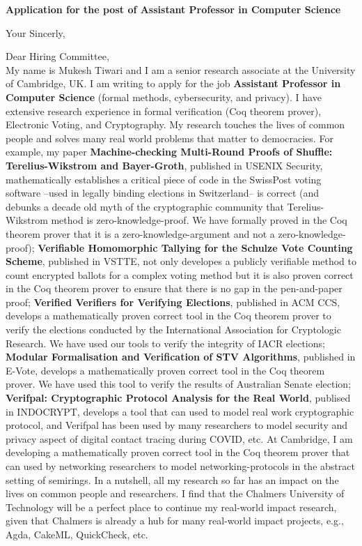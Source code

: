 \documentclass[11pt,a4paper,roman]{moderncv}
\begin{document}
\date{}
\opening{\textbf{Application for the post of Assistant Professor in Computer Science}}
\closing{Your Sincerly, \vspace{-1em}}



\makelettertitle


Dear Hiring Committee, 
\\
\vspace{1em}
My name is Mukesh Tiwari and I am a senior research associate at 
the University of Cambridge, UK. I am writing to apply
for the job \textbf{Assistant Professor in Computer Science} (formal methods, cybersecurity, and 
privacy). I have extensive research experience in
formal verification (Coq theorem prover), Electronic Voting, and Cryptography.
My research touches the lives of common people and solves 
many real world problems that matter to democracies. For example, my paper 
\textbf{Machine-checking Multi-Round Proofs of Shuffle: Terelius-Wikstrom and Bayer-Groth}, 
published in USENIX Security, mathematically establishes a critical piece of 
code in the SwissPost voting software --used in legally binding 
elections in Switzerland-- is correct (and debunks a decade old myth of the cryptographic 
community that Terelius-Wikstrom method is zero-knowledge-proof. We have formally 
proved in the Coq theorem prover that it is a zero-knowledge-argument and not 
a zero-knowledge-proof);
\textbf{Verifiable Homomorphic Tallying for the Schulze Vote Counting Scheme}, published 
in VSTTE, not only developes a publicly verifiable method to count encrypted ballots for a complex voting method but it 
is also proven correct in the Coq theorem prover to ensure that there is no gap in 
the pen-and-paper proof; 
\textbf{Verified Verifiers for 
Verifying Elections}, published in ACM CCS, develops a mathematically proven correct tool 
in the Coq theorem prover to verify the elections conducted by 
the International Association for Cryptologic Research. We have used 
our tools to verify the integrity of IACR elections; \textbf{Modular Formalisation and 
Verification of STV Algorithms}, published in E-Vote, develops a mathematically proven 
correct tool in the Coq theorem prover. We have used this tool to verify
the results of Australian Senate election; 
\textbf{Verifpal: Cryptographic Protocol Analysis for the Real World}, publised in 
INDOCRYPT, develops a tool that can used to model real work cryptographic protocol, and 
Verifpal has been used by many researchers to model security and privacy aspect of 
digital contact tracing during COVID, etc.
At Cambridge, I am developing a mathematically proven correct tool in the Coq theorem prover 
that can used by networking researchers to model networking-protocols in the abstract 
setting of semirings.
In a nutshell, all my research so far has an impact on the lives on common people and 
researchers.  I find that the 
Chalmers University of Technology will be a perfect place to continue my real-world impact 
research, given that 
Chalmers is already a hub for many real-world impact projects, e.g., Agda, CakeML, 
QuickCheck, etc. 
\end{document}
